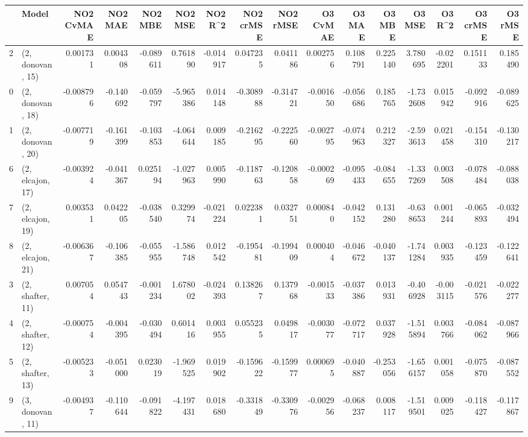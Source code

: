 \begin{tabular}{llrrrrrrrrrrrrrr}
\toprule
{} &             Model &  NO2 CvMAE &   NO2 MAE &   NO2 MBE &    NO2 MSE &   NO2 R\textasciicircum2 &  NO2 crMSE &  NO2 rMSE &  O3 CvMAE &    O3 MAE &    O3 MBE &     O3 MSE &    O3 R\textasciicircum2 &  O3 crMSE &   O3 rMSE \\
\midrule
2  &  (2, donovan, 15) &   0.001731 &  0.004308 & -0.089611 &   0.761890 & -0.014917 &   0.047235 &  0.041186 &  0.002756 &  0.108791 &  0.225140 &   3.780695 & -0.022201 &  0.151133 &  0.185490 \\
0  &  (2, donovan, 18) &  -0.008796 & -0.140692 & -0.059797 &  -5.965386 &  0.014148 &  -0.308988 & -0.314721 & -0.001650 & -0.056686 &  0.185765 &  -1.732608 &  0.015942 & -0.092916 & -0.089625 \\
1  &  (2, donovan, 20) &  -0.007719 & -0.161399 & -0.103853 &  -4.064644 &  0.009185 &  -0.216295 & -0.222560 & -0.002795 & -0.074963 &  0.212327 &  -2.593613 &  0.021458 & -0.154310 & -0.130217 \\
6  &  (2, elcajon, 17) &  -0.003924 & -0.041367 &  0.025194 &  -1.027963 &  0.005990 &  -0.118763 & -0.120858 & -0.000269 & -0.095433 & -0.084655 &  -1.337269 &  0.003508 & -0.078484 & -0.088038 \\
7  &  (2, elcajon, 19) &   0.003531 &  0.042205 & -0.038540 &   0.329974 & -0.021224 &   0.022381 &  0.032751 &  0.000840 & -0.042152 &  0.131280 &  -0.638653 &  0.001244 & -0.065893 & -0.032494 \\
8  &  (2, elcajon, 21) &  -0.006367 & -0.106385 & -0.055955 &  -1.586748 &  0.012542 &  -0.195481 & -0.199409 &  0.000404 & -0.046672 & -0.040137 &  -1.741284 &  0.003935 & -0.123459 & -0.122641 \\
3  &  (2, shafter, 11) &   0.007054 &  0.054743 & -0.001234 &   1.678002 & -0.024393 &   0.138267 &  0.137968 & -0.001533 & -0.037386 &  0.013931 &  -0.406928 & -0.003115 & -0.021576 & -0.022277 \\
4  &  (2, shafter, 12) &  -0.000754 & -0.004395 & -0.030494 &   0.601416 &  0.003955 &   0.055235 &  0.049817 & -0.003077 & -0.072717 &  0.037928 &  -1.515894 &  0.003766 & -0.084062 & -0.087966 \\
5  &  (2, shafter, 13) &  -0.005233 & -0.051000 &  0.023019 &  -1.969525 &  0.019902 &  -0.159622 & -0.159977 &  0.000695 & -0.040887 & -0.253056 &  -1.656157 &  0.001058 & -0.075870 & -0.087552 \\
9  &  (3, donovan, 11) &  -0.004937 & -0.110644 & -0.091822 &  -4.197431 &  0.018680 &  -0.331849 & -0.330976 & -0.002956 & -0.068237 &  0.008117 &  -1.519501 &  0.009025 & -0.118427 & -0.117867 \\

\end{tabular}
